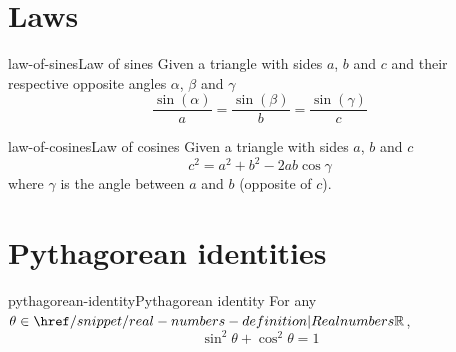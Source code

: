 \documentclass[preview]{standalone}
\begin{document}
\genpage

\section{Laws}

\begin{snippettheorem}{law-of-sines}{Law of sines}
    Given a triangle with sides \(a\), \(b\) and \(c\) and their respective opposite angles
    \(\alpha\), \(\beta\) and \(\gamma\)
    \[
        \frac{\sin(\alpha)}{a} =
        \frac{\sin(\beta)}{b} =
        \frac{\sin(\gamma)}{c}
    \]
\end{snippettheorem}

\begin{snippettheorem}{law-of-cosines}{Law of cosines}
    Given a triangle with sides \(a\), \(b\) and \(c\)
    \[
        c^2 = a^2 + b^2 - 2ab\cos\gamma
    \]
    where \(\gamma\) is the angle between \(a\) and \(b\) (opposite of \(c\)).
\end{snippettheorem}

\section{Pythagorean identities}

\begin{snippettheorem}{pythagorean-identity}{Pythagorean identity}
    For any \(\theta \in \realnumbers\),
    \[
        \sin^2\theta + \cos^2\theta = 1
    \]
\end{snippettheorem}
\end{document}
